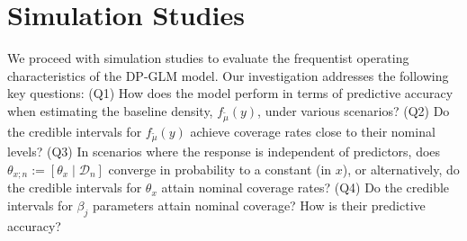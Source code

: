 \documentclass{article}[12pt]
\newcommand{\tmu}{\widetilde{\mu}}
\begin{document}
\section{Simulation Studies}
\label{sec:sim}
We proceed with simulation studies to evaluate the frequentist operating characteristics of the DP-GLM model. Our investigation addresses the following key questions: \newline (Q1) How does the model perform in terms of predictive accuracy when estimating the baseline density, $f_{\tmu}(y)$, under various scenarios? \newline (Q2) Do the credible intervals for $f_{\tmu}(y)$ achieve coverage rates close to their nominal levels? \newline (Q3) In scenarios where the response is independent of predictors, does $\theta_{x; n} := [\theta_x \mid \mathcal{D}_n]$ converge in probability to a constant (in $x$), or alternatively, do the credible intervals for $\theta_x$ attain nominal coverage rates? \newline  (Q4) Do the credible intervals for $\beta_j$ parameters attain nominal coverage? How is their predictive accuracy?
\end{document}
